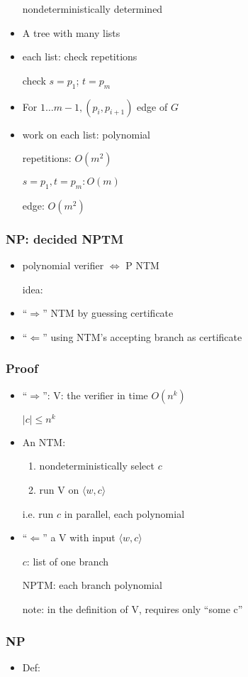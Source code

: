 \begin{frame}[allowframebreaks]
\begin{itemize}
nondeterministically determined
\item A tree with many lists
\item each list: check repetitions

check $s=p_1$; $t=p_m$

\item For $1 \ldots m-1, (p_i, p_{i+1})$ edge of $G$
\item work on each list: polynomial

repetitions: $O(m^2)$

$s=p_1, t = p_m: O(m)$

edge: $O(m^2)$

\end{itemize}\end{frame} \begin{frame}[allowframebreaks] \frametitle{NP: decided NPTM}

  \begin{itemize}
\item polynomial verifier $\Leftrightarrow$ P NTM

idea:

\item ``$\Rightarrow$'' NTM by guessing certificate

\item ``$\Leftarrow$'' using NTM's accepting branch as  certificate

\end{itemize}\end{frame} \begin{frame}[allowframebreaks] \frametitle{Proof}
  \begin{itemize}
\item ``$\Rightarrow$'': V: the verifier in time $O(n^k)$

$|c|\leq n^k$
\item An  NTM:
  \begin{enumerate}
  \item nondeterministically select $c$
  \item run V on $\langle  w,c\rangle $
  \end{enumerate}
i.e. run $c$ in parallel, each polynomial
\item ``$\Leftarrow$'' a V with input $\langle  w,c\rangle $

$c$: list of one branch

NPTM: each branch polynomial

note: in the definition of V, requires only ``some c''


\end{itemize}\end{frame} \begin{frame}[allowframebreaks] \frametitle{NP}
  \begin{itemize}
\item Def:


\end{itemize}
\end{frame}

